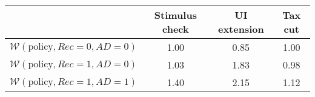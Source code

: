\begin{tabular}{@{}lccc@{}} 
\toprule 
                          & Stimulus check      & UI extension    & Tax cut    \\  \midrule 
$\mathcal{W}(\text{policy}, Rec=0, AD=0)$ & 1.00  & 0.85  & 1.00     \\ 
$\mathcal{W}(\text{policy}, Rec=1, AD=0)$ & 1.03  & 1.83  & 0.98     \\ 
$\mathcal{W}(\text{policy}, Rec=1, AD=1)$ & 1.40  & 2.15  & 1.12     \\ \bottomrule 
\end{tabular}  
